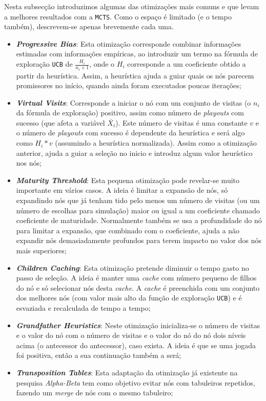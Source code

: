 \documentclass[12pt,a4paper,oneside]{article}
\begin{document}
Nesta subsecção introduzimos algumas das otimizações mais comuns e que
levam a melhores resultados com a \texttt{MCTS}. Como o espaço é
limitado (e o tempo também), descrevem-se apenas brevemente cada uma.

\begin{itemize}
\item \textbf{\textit{Progressive Bias}}: Esta otimização corresponde
  combinar informações estimadas com informações empíricas, ao
  introduzir um termo na fórmula de exploração \texttt{UCB} de
  $\frac{H_i}{n_i + 1}$, onde o $H_i$ corresponde a um coeficiente
  obtido a partir da heurística. Assim, a heurística ajuda a guiar
  quais os nós parecem promissores no início, quando ainda foram
  executados poucas iterações;
\item \textbf{\textit{Virtual Visits}}: Corresponde a iniciar o nó com
  um conjunto de visitas (o $n_i$ da fórmula de exploração) positivo,
  assim como número de \textit{playouts} com sucesso (que afeta a
  variável $\bar{X_i}$). Este número de visitas é uma constante $v$ e
  o número de \textit{playouts} com sucesso é dependente da heurística
  e será algo como $H_i * v$ (assumindo a heurística
  normalizada). Assim como a otimização anterior, ajuda a guiar a
  seleção no inicio e introduz algum valor heurístico nos nós;
\item \textbf{\textit{Maturity Threshold}}: Esta pequena otimização
  pode revelar-se muito importante em vários casos. A ideia é limitar
  a expansão de nós, só expandindo nós que já tenham tido pelo menos
  um número de visitas (ou um número de escolhas para simulação) maior
  ou igual a um coeficiente chamado coeficiente de
  maturidade. Normalmente também se usa a profundidade do nó para
  limitar a expansão, que combinado com o coeficiente, ajuda a não
  expandir nós demasiadamente profundos para terem impacto no valor
  dos nós mais superiores;
\item \textbf{\textit{Children Caching}}: Esta otimização pretende
  diminuir o tempo gasto no passo de seleção. A ideia é manter uma
  \textit{cache} com número pequeno de filhos do nó e só selecionar
  nós desta \textit{cache}. A \textit{cache} é preenchida com um
  conjunto dos melhores nós (com valor mais alto da função de
  exploração \texttt{UCB}) e é esvaziada e recalculada de tempo a
  tempo;
\item \textbf{\textit{Grandfather Heuristics}}: Neste otimização
  inicializa-se o número de visitas e o valor do nó com o número de
  visitas e o valor do nó do nó dois níveis acima (o antecessor do
  antecessor), caso exista. A ideia é que se uma jogada foi positiva,
  então a sua continuação também a será;
\item \textbf{\textit{Transposition Tables}}: Esta adaptação da
  otimização já existente na pesquisa \textit{Alpha-Beta} tem como
  objetivo evitar nós com tabuleiros repetidos, fazendo um
  \textit{merge} de nós com o mesmo tabuleiro;
\end{itemize}
\end{document}
